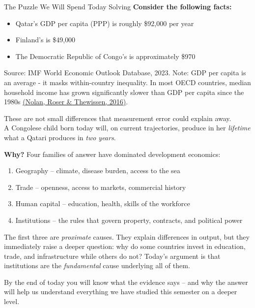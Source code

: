 \documentclass[10pt]{beamer}
\begin{document}
\begin{frame}[allowframebreaks]{The Puzzle We Will Spend Today Solving}
\textbf{Consider the following facts:}
\begin{itemize}
\item Qatar's GDP per capita (PPP) is roughly \$92{,}000 per year
\item Finland's is \$49{,}000
\item The Democratic Republic of Congo's is approximately \$970
\end{itemize}
{\footnotesize Source: IMF World Economic Outlook Database, 2023. Note: GDP per capita is an average - it masks within-country inequality. In most OECD countries, median household income has grown significantly slower than GDP per capita since the 1980s \href{https://cepr.org/voxeu/columns/stagnating-median-incomes-despite-economic-growth-explaining-divergence-27-oecd}{(Nolan, Roser \& Thewissen, 2016)}.}


These are not small differences that measurement error could explain away.\\
A Congolese child born today will, on current trajectories, produce in her \emph{lifetime} what a Qatari produces in \emph{two years}.


\textbf{Why?}
Four families of answer have dominated development economics:
\begin{enumerate}
\item \alert{Geography} -- climate, disease burden, access to the sea
\item \alert{Trade} -- openness, access to markets, commercial history
\item \alert{Human capital} -- education, health, skills of the workforce
\item \alert{Institutions} -- the rules that govern property, contracts, and political power
\end{enumerate}


The first three are \emph{proximate} causes. They explain differences in output, but they immediately raise a deeper question: why do some countries invest in education, trade, and infrastructure while others do not? Today's argument is that \alert{institutions} are the \emph{fundamental} cause underlying all of them.

By the end of today you will know what the evidence says -- and why the answer will help us understand everything we have studied this semester on a deeper level.
\end{frame}
\end{document}
